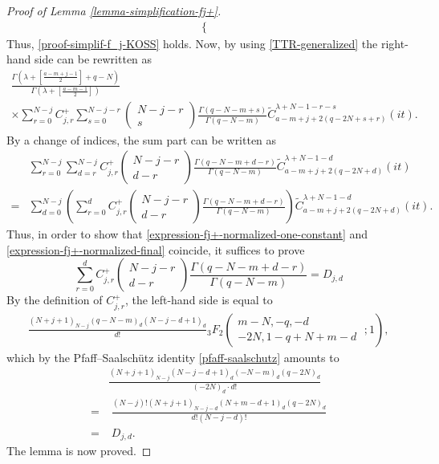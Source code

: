 \documentclass[12pt, pdflatex, a4paper]{article}
\theoremstyle{plain}
\theoremstyle{definition}
\def\Geg{\widetilde{C}}
\begin{document}
\begin{proof}[Proof of Lemma \ref{lemma-simplification-fj+}]
\begin{align*}
\begin{cases}
\end{cases}
\end{align*}
Thus, \eqref{proof-simplif-f_j-KOSS} holds. Now, by using \eqref{TTR-generalized} the right-hand side can be rewritten as
\begin{multline*}
\frac{\Gamma(\lambda+\left[\frac{a-m+j-1}{2}\right] + q-N)}{\Gamma(\lambda + \left[\frac{a-m-1}{2}\right])}\\
\times \sum_{r=0}^{N-j}C_{j,r}^+ \sum_{s=0}^{N-j-r}\begin{pmatrix}
N-j-r\\s
\end{pmatrix}
\frac{\Gamma(q-N-m+s)}{\Gamma(q-N-m)}\Geg_{a-m+j+2(q-2N+s+r)}^{\lambda+N-1-r-s}(it).
\end{multline*}
By a change of indices, the sum part can be written as
\begin{align*}
&\sum_{r=0}^{N-j}\sum_{d=r}^{N-j}C_{j,r}^+\begin{pmatrix}
N-j-r\\d-r
\end{pmatrix}
\frac{\Gamma(q-N-m+d-r)}{\Gamma(q-N-m)}\Geg_{a-m+j+2(q-2N+d)}^{\lambda+N-1-d}(it)\\
=& \sum_{d=0}^{N-j}\left(\sum_{r=0}^{d}C_{j,r}^+\begin{pmatrix}
N-j-r\\d-r
\end{pmatrix}
\frac{\Gamma(q-N-m+d-r)}{\Gamma(q-N-m)}\right)\Geg_{a-m+j+2(q-2N+d)}^{\lambda+N-1-d}(it).
\end{align*}
Thus, in order to show that \eqref{expression-fj+-normalized-one-constant} and \eqref{expression-fj+-normalized-final} coincide, it suffices to prove
\begin{equation*}
\sum_{r=0}^{d}C_{j,r}^+\begin{pmatrix}
N-j-r\\d-r
\end{pmatrix}
\frac{\Gamma(q-N-m+d-r)}{\Gamma(q-N-m)} = D_{j,d}
\end{equation*}
By the definition of $C_{j,r}^+$, the left-hand side is equal to
\begin{align*}
\frac{(N+j+1)_{N-j}(q-N-m)_d(N-j-d+1)_d}{d!}{}_3F_2\left(
\begin{matrix}
m-N, -q, -d\\
-2N, 1-q+N+m-d
\end{matrix}\;;1
\right),
\end{align*}
which by the Pfaff--Saalschütz identity \eqref{pfaff-saalschutz} amounts to
\begin{align*}
&\frac{(N+j+1)_{N-j}(N-j-d+1)_d(-N-m)_d(q-2N)_d}{(-2N)_d\cdot d!}\\
= & \;\frac{(N-j)!(N+j+1)_{N-j-d}(N+m-d+1)_{d}(q-2N)_d}{d!(N-j-d)!}\\
= &\;  D_{j,d}.
\end{align*}
The lemma is now proved.
\end{proof}
\end{document}
